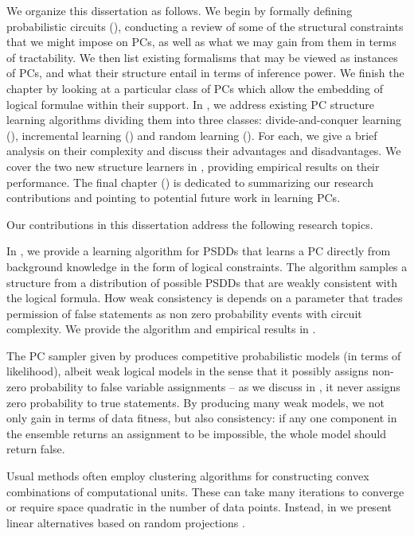 We organize this dissertation as follows. We begin  by formally defining probabilistic
circuits (), conducting a review of some of the structural constraints that we might
impose on PCs, as well as what we may gain from them in terms of tractability.
We then list existing formalisms that may be viewed as instances of PCs, and what their structure
entail in terms of inference power. We finish the chapter by looking at a particular class of PCs
which allow the embedding of logical formulae within their support. In , we address existing PC structure
learning algorithms dividing them into three classes: divide-and-conquer learning
(), incremental learning () and random learning
(). For each, we give a brief analysis on their complexity and discuss their
advantages and disadvantages. We cover the two new structure learners in ,
providing empirical results on their performance. The final chapter () is
dedicated to summarizing our research contributions and pointing to potential future work in
learning PCs.

Our contributions in this dissertation address the following research topics.


In \citet{geh21a}, we provide a learning algorithm for PSDDs that learns a PC directly from
background knowledge in the form of logical constraints. The algorithm samples a structure from a
distribution of possible PSDDs that are weakly consistent with the logical formula. How weak
consistency is depends on a parameter that trades permission of false statements as non zero
probability events with circuit complexity. We provide the algorithm and empirical results in
.


The PC sampler given by \citet{geh21a} produces competitive probabilistic models (in terms of
likelihood), albeit weak logical models in the sense that it possibly assigns non-zero probability
to false variable assignments -- as we discuss in , it never assigns zero
probability to true statements. By producing many weak models, we not only gain in terms of data
fitness, but also consistency: if any one component in the ensemble returns an assignment to be
impossible, the whole model should return false.


Usual methods often employ clustering algorithms for constructing convex combinations of
computational units. These can take many iterations to converge or require space quadratic in the
number of data points. Instead, in  we present linear alternatives based on random
projections \citep{dasgupta08a,dasgupta08b}.

